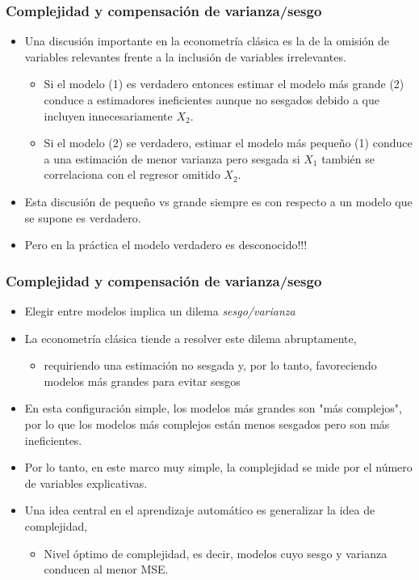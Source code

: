 \documentclass[
  shownotes,
  xcolor={svgnames},
  hyperref={colorlinks,citecolor=DarkBlue,linkcolor=DarkRed,urlcolor=DarkBlue}
  , aspectratio=169]{beamer}
\begin{document}
\begin{frame}
\frametitle{Complejidad y compensación de varianza/sesgo}

\begin{itemize}
  \item Una discusión importante en la econometría clásica es la de la omisión de variables relevantes frente a la inclusión de variables irrelevantes. 
  \medskip
  \begin{itemize}
    \item Si el modelo (1) es verdadero entonces estimar el modelo más grande (2) conduce a estimadores ineficientes aunque no sesgados debido a que incluyen innecesariamente $X_2$. 
    \medskip
    \item Si el modelo (2) se verdadero, estimar el modelo más pequeño (1) conduce a una estimación de menor varianza pero sesgada si $ X_1 $ también se correlaciona con el regresor omitido $X_2$. 
  \end{itemize}
  \medskip
  \item Esta discusión de pequeño vs grande siempre es con respecto a un modelo que se supone es verdadero.
  \medskip
\item  Pero en la práctica el modelo verdadero es desconocido!!!

\end{itemize}


\end{frame}

\begin{frame}
\frametitle{Complejidad y compensación de varianza/sesgo}


\begin{itemize}
  \item Elegir entre modelos implica un dilema {\it sesgo/varianza}
  \medskip
\item La econometría clásica tiende a resolver este dilema abruptamente, 
  \begin{itemize}
    \item  requiriendo una estimación no sesgada y, por lo tanto, favoreciendo modelos más grandes para evitar sesgos
  \end{itemize}
\medskip
\item En esta configuración simple, los modelos más grandes son "más complejos", por lo que los modelos más complejos están menos sesgados pero son más ineficientes. 
\medskip
\item Por lo tanto, en este marco muy simple, la complejidad se mide por el número de variables explicativas.
\medskip
\item Una idea central en el aprendizaje automático es generalizar la idea de complejidad, 
  \begin{itemize}
    \item Nivel óptimo de complejidad, es decir, modelos cuyo sesgo y varianza conducen al menor MSE.
  \end{itemize}
\end{itemize}

\end{frame}
\end{document}

